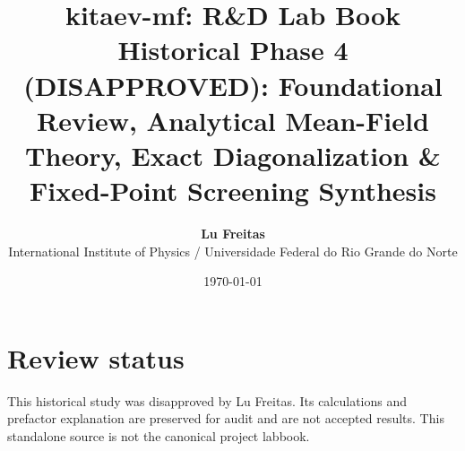 \documentclass[11pt,a4paper,oneside]{memoir}
\title{\Huge\bfseries\color{labbookaccent} kitaev-mf: R\&D Lab Book\\[4mm]
\Large Historical Phase 4 (DISAPPROVED): Foundational Review, Analytical Mean-Field Theory, Exact Diagonalization \& Fixed-Point Screening Synthesis}
\author{\textbf{Lu Freitas}\\[1mm]
International Institute of Physics / Universidade Federal do Rio Grande do Norte}
\date{\today}
\begin{document}
\frontmatter
\maketitle
\chapter*{Review status}
This historical study was disapproved by Lu Freitas. Its calculations and
prefactor explanation are preserved for audit and are not accepted results.
This standalone source is not the canonical project labbook.
\tableofcontents*

\mainmatter






\end{document}
